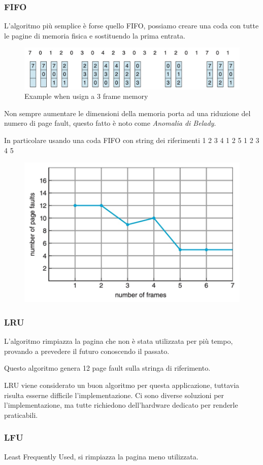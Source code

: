 \subsubsection{FIFO}
L'algoritmo più semplice è forse quello FIFO, possiamo creare una coda con tutte le pagine di memoria fisica e sostituendo la prima entrata.

\begin{figure}[H]
    \centering
    \includegraphics[width=0.5\linewidth]{assets/FIFO-paging-ex.jpg}
    \caption{Example when usign a 3 frame memory}
\end{figure}

\begin{note}
    Non sempre aumentare le dimensioni della memoria porta ad una riduzione del numero di page fault, questo fatto è noto come \textit{Anomalia di Belady}.

    In particolare usando una coda FIFO con string dei riferimenti 1 2 3 4 1 2 5 1 2 3 4 5
    \begin{figure}[H]
        \includegraphics[width=0.4\linewidth]{assets/anomalia-belady.jpeg}
    \end{figure}
\end{note}

\subsubsection{LRU}
L'algoritmo rimpiazza la pagina che non è stata utilizzata per più tempo, provando a prevedere il futuro conoscendo il passato.

Questo algoritmo genera 12 page fault sulla stringa di riferimento.

\spacer
LRU viene considerato un buon algoritmo per questa applicazione, tuttavia risulta esserne difficile l'implementazione. Ci sono diverse soluzioni per l'implementazione, ma tutte richiedono dell'hardware dedicato per renderle praticabili.

\subsubsection{LFU}
Least Frequently Used, si rimpiazza la pagina meno utilizzata.

